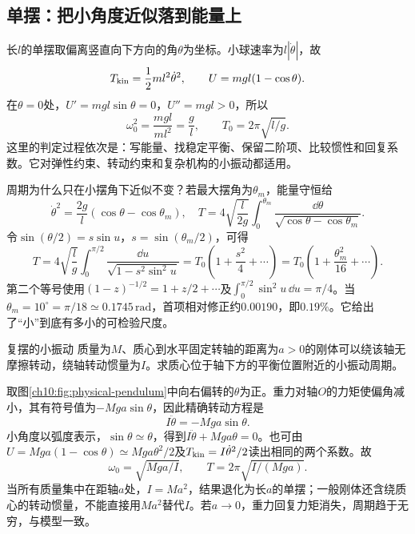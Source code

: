 \subsection{单摆：把小角度近似落到能量上}
长$l$的单摆取偏离竖直向下方向的角$\theta$为坐标。小球速率为$l|\dot\theta|$，故
\[
 T_{\rm kin}=\frac12ml^2\dot\theta^2,\qquad
 U=mgl(1-\cos\theta).
\]
在$\theta=0$处，$U'=mgl\sin\theta=0$，$U''=mgl>0$，所以
\[
 \omega_0^2=\frac{mgl}{ml^2}=\frac gl,\qquad
 T_0=2\pi\sqrt{l/g}.
\]
这里的判定过程依次是：写能量、找稳定平衡、保留二阶项、比较惯性和回复系数。它对弹性约束、转动约束和复杂机构的小振动都适用。

周期为什么只在小摆角下近似不变？若最大摆角为$\theta_m$，能量守恒给
\[
 \dot\theta^2=\frac{2g}{l}(\cos\theta-\cos\theta_m),\quad
 T=4\sqrt{\frac l{2g}}\int_0^{\theta_m}
 \frac{\dd\theta}{\sqrt{\cos\theta-\cos\theta_m}}.
\]
令$\sin(\theta/2)=s\sin u$，$s=\sin(\theta_m/2)$，可得
\[
 T=4\sqrt{\frac lg}\int_0^{\pi/2}\frac{\dd u}{\sqrt{1-s^2\sin^2u}}
 =T_0\left(1+\frac{s^2}{4}+\cdots\right)
 =T_0\left(1+\frac{\theta_m^2}{16}+\cdots\right).
\]
第二个等号使用$(1-z)^{-1/2}=1+z/2+\cdots$及$\int_0^{\pi/2}\sin^2u\,\dd u=\pi/4$。当$\theta_m=10^\circ=\pi/18\simeq0.1745\,\mathrm{rad}$，首项相对修正约$0.00190$，即$0.19\%$。它给出了“小”到底有多小的可检验尺度。

\begin{origexamplebox}{复摆的小振动}\label{ch10:ex:physical-pendulum}
质量为$M$、质心到水平固定转轴的距离为$a>0$的刚体可以绕该轴无摩擦转动，绕轴转动惯量为$I$。求质心位于轴下方的平衡位置附近的小振动周期。
\end{origexamplebox}
\begin{xesolution}
取图\ref{ch10:fig:physical-pendulum}中向右偏转的$\theta$为正。重力对轴$O$的力矩使偏角减小，其有符号值为$-Mga\sin\theta$，因此精确转动方程是
\[
 I\ddot\theta=-Mga\sin\theta.
\]
\chTenPendulumFigure
小角度以弧度表示，$\sin\theta\simeq\theta$，得到$I\ddot\theta+Mga\theta=0$。也可由$U=Mga(1-\cos\theta)\simeq Mga\theta^2/2$及$T_{\rm kin}=I\dot\theta^2/2$读出相同的两个系数。故
\[
 \boxed{\omega_0=\sqrt{Mga/I}},\qquad
 \boxed{T=2\pi\sqrt{I/(Mga)}}.
\]
当所有质量集中在距轴$a$处，$I=Ma^2$，结果退化为长$a$的单摆；一般刚体还含绕质心的转动惯量，不能直接用$Ma^2$替代$I$。若$a\to0$，重力回复力矩消失，周期趋于无穷，与模型一致。
\end{xesolution}

